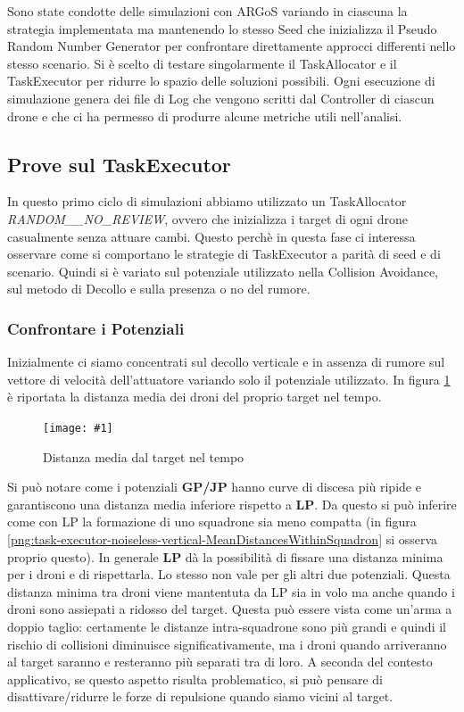 \documentclass[a4paper,11pt,oneside, table]{article}
\newcommand{\putimage}[4] {
	\begin{figure}[H]
	    \centering
	    \texttt{[image: \#1]}
	    \caption{#2}\label{#3}
	\end{figure}
}
\begin{document}
Sono state condotte delle simulazioni con ARGoS variando in ciascuna la strategia implementata ma mantenendo lo stesso Seed che inizializza il Pseudo Random Number Generator per confrontare direttamente approcci differenti nello stesso scenario.
Si \`e scelto di testare singolarmente il TaskAllocator e il TaskExecutor per ridurre lo spazio delle soluzioni possibili.
Ogni esecuzione di simulazione genera dei file di Log che vengono scritti dal Controller di ciascun drone e che ci ha permesso di produrre alcune metriche utili nell'analisi.

\subsection{Prove sul TaskExecutor}

In questo primo ciclo di simulazioni abbiamo utilizzato un TaskAllocator \textit{RANDOM\_\_NO\_REVIEW}, ovvero che inizializza i target di ogni drone casualmente senza attuare cambi.
Questo perch\`e in questa fase ci interessa osservare come si comportano le strategie di TaskExecutor a parit\`a di seed e di scenario.
Quindi si \`e variato sul potenziale utilizzato nella Collision Avoidance, sul metodo di Decollo e sulla presenza o no del rumore.

\subsubsection{Confrontare i Potenziali}

Inizialmente ci siamo concentrati sul decollo verticale e in assenza di rumore sul vettore di velocit\`a dell'attuatore variando solo il potenziale utilizzato.
In figura \ref{png:task-executor-noiseless-vertical-MeanDistanceFromTarget} \`e riportata la distanza media dei droni del proprio target nel tempo.

\putimage{images/experiments/task-executor-noiseless-vertical/MeanDistanceFromTarget.png}{Distanza media dal target nel tempo}{png:task-executor-noiseless-vertical-MeanDistanceFromTarget}{0.99}

Si pu\`o notare come i potenziali \textbf{GP/JP} hanno curve di discesa pi\`u ripide e garantiscono una distanza media inferiore rispetto a \textbf{LP}.
Da questo si pu\`o inferire come con LP la formazione di uno squadrone sia meno compatta (in figura \ref{png:task-executor-noiseless-vertical-MeanDistancesWithinSquadron} si osserva proprio questo).
In generale \textbf{LP} d\`a la possibilit\`a di fissare una distanza minima per i droni e di rispettarla. Lo stesso non vale per gli altri due potenziali.
Questa distanza minima tra droni viene mantentuta da LP sia in volo ma anche quando i droni sono assiepati a ridosso del target.
Questa pu\`o essere vista come un'arma a doppio taglio: certamente le distanze intra-squadrone sono pi\`u grandi e quindi il rischio di collisioni diminuisce significativamente, ma i droni quando arriveranno al target saranno e resteranno più separati tra di loro. A seconda del contesto applicativo, se questo aspetto risulta problematico, si può pensare di disattivare/ridurre le forze di repulsione quando siamo vicini al target.
\end{document}
